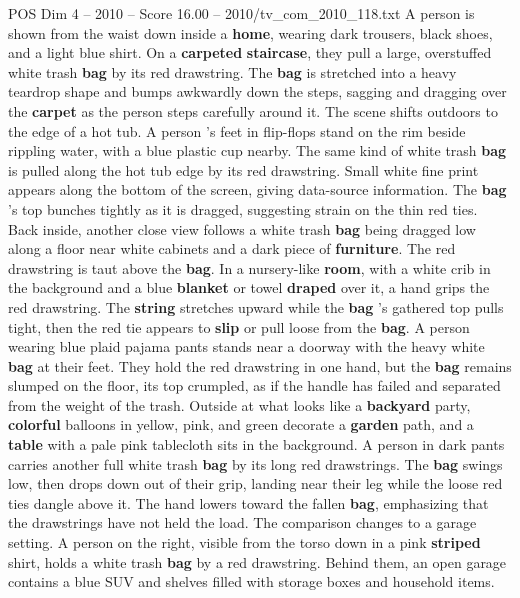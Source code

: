 \begin{textsample}{POS Dim 4 – 2010 – Score 16.00 – 2010/tv\_com\_2010\_118.txt}  \label{ex:f4_pos_030}
A person is shown from the waist down inside a \textbf{home}, wearing dark trousers, black shoes, and a light blue shirt.
On a \textbf{carpeted} \textbf{staircase}, they pull a large, overstuffed white trash \textbf{bag} by its red drawstring.
The \textbf{bag} is stretched into a heavy teardrop shape and bumps awkwardly down the steps, sagging and dragging over the \textbf{carpet} as the person steps carefully around it.
The scene shifts outdoors to the edge of a hot tub.
A person ’s feet in flip-flops stand on the rim beside rippling water, with a blue plastic cup nearby.
The same kind of white trash \textbf{bag} is pulled along the hot tub edge by its red drawstring.
Small white fine print appears along the bottom of the screen, giving data-source information.
The \textbf{bag} ’s top bunches tightly as it is dragged, suggesting strain on the thin red ties.
Back inside, another close view follows a white trash \textbf{bag} being dragged low along a floor near white cabinets and a dark piece of \textbf{furniture}.
The red drawstring is taut above the \textbf{bag}.
In a nursery-like \textbf{room}, with a white crib in the background and a blue \textbf{blanket} or towel \textbf{draped} over it, a hand grips the red drawstring.
The \textbf{string} stretches upward while the \textbf{bag} ’s gathered top pulls tight, then the red tie appears to \textbf{slip} or pull loose from the \textbf{bag}.
A person wearing blue plaid pajama pants stands near a doorway with the heavy white \textbf{bag} at their feet.
They hold the red drawstring in one hand, but the \textbf{bag} remains slumped on the floor, its top crumpled, as if the handle has failed and separated from the weight of the trash.
Outside at what looks like a \textbf{backyard} party, \textbf{colorful} balloons in yellow, pink, and green decorate a \textbf{garden} path, and a \textbf{table} with a pale pink tablecloth sits in the background.
A person in dark pants carries another full white trash \textbf{bag} by its long red drawstrings.
The \textbf{bag} swings low, then drops down out of their grip, landing near their leg while the loose red ties dangle above it.
The hand lowers toward the fallen \textbf{bag}, emphasizing that the drawstrings have not held the load.
The comparison changes to a garage setting.
A person on the right, visible from the torso down in a pink \textbf{striped} shirt, holds a white trash \textbf{bag} by a red drawstring.
Behind them, an open garage contains a blue SUV and shelves filled with storage boxes and household items.

\end{textsample}
